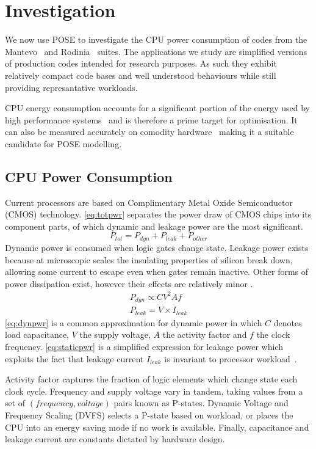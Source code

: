 \section{Investigation}
\label{sec:investigation}
We now use POSE to investigate the CPU power consumption of codes from the Mantevo~\cite{heroux:2009aa} and Rodinia~\cite{che:2009aa} suites.
The applications we study are simplified versions of production codes intended for research purposes.
As such they exhibit relatively compact code bases and well understood behaviours while still providing represantative workloads.

CPU energy consumption accounts for a significant portion of the energy used by high performance systems~\cite{rong:2010aa} and is therefore a prime target for optimisation.
It can also be measured accurately on comodity hardware~\cite{hackenberg:2013aa} making it a suitable candidate for POSE modelling.

\subsection{CPU Power Consumption}
\label{ssec:cpupower}
Current processors are based on Complimentary Metal Oxide Semiconductor (CMOS) technology.
\autoref{eq:totpwr} separates the power draw of CMOS chips into its component parts, of which dynamic and leakage power are the most significant.
\begin{equation}
\label{eq:totpwr}
P_{tot} = P_{dyn} + P_{leak} + P_{other}
\end{equation}
Dynamic power is consumed when logic gates change state.
Leakage power exists because at microscopic scales the insulating properties of silicon break down, allowing some current to escape even when gates remain inactive.
Other forms of power dissipation exist, however their effects are relatively minor \cite{kaxiras:2008aa}.
\begin{gather}
P_{dyn} \propto CV^{2}Af \label{eq:dynpwr} \\
P_{leak} = V \times I_{leak} \label{eq:staticpwr}
\end{gather}
\autoref{eq:dynpwr} is a common approximation for dynamic power in which $C$ denotes load capacitance, $V$ the supply voltage, $A$ the activity factor and $f$ the clock frequency.
\autoref{eq:staticpwr} is a simplified expression for leakage power which exploits the fact that leakage current $I_{leak}$ is invariant to processor workload~\cite{kim:2003aa}.

Activity factor captures the fraction of logic elements which change state each clock cycle.
Frequency and supply voltage vary in tandem, taking values from a set of $(frequency, voltage)$ pairs known as P-states.
Dynamic Voltage and Frequency Scaling (DVFS) selects a P-state based on workload, or places the CPU into an energy saving mode if no work is available.
Finally, capacitance and leakage current are constants dictated by hardware design.

